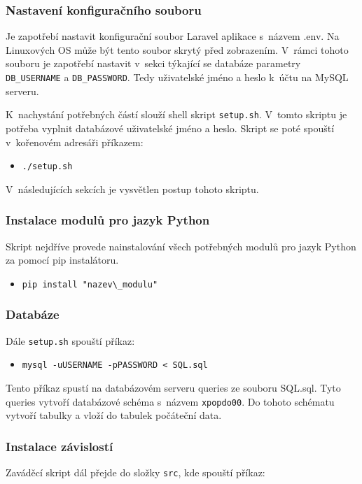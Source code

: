 \subsubsection{Nastavení konfiguračního souboru}
Je zapotřebí nastavit konfigurační soubor Laravel aplikace s~názvem .env. Na Linuxových OS může být tento soubor skrytý před zobrazením. V~rámci tohoto souboru je zapotřebí nastavit v~sekci týkající se databáze parametry \verb|DB_USERNAME| a \verb|DB_PASSWORD|. Tedy uživatelské jméno a heslo k~účtu na MySQL serveru.

K~nachystání potřebných částí slouží shell skript \verb|setup.sh|. V~tomto skriptu je potřeba vyplnit databázové uživatelské jméno a heslo. Skript se poté spouští v~kořenovém adresáři příkazem:
\begin{itemize}
	\item \verb|./setup.sh|
\end{itemize}

V~následujících sekcích je vysvětlen postup tohoto skriptu.

\subsubsection{Instalace modulů pro jazyk Python}
Skript nejdříve provede nainstalování všech potřebných modulů pro jazyk Python za pomocí pip instalátoru.

\begin{itemize}
	\item \verb|pip install "nazev\_modulu"|
\end{itemize}

\subsubsection{Databáze}
Dále \verb|setup.sh| spouští příkaz:

\begin{itemize}
	\item \verb|mysql -uUSERNAME -pPASSWORD < SQL.sql|
\end{itemize}

Tento příkaz spustí na databázovém serveru queries ze souboru SQL.sql. Tyto queries vytvoří databázové schéma s~názvem \verb|xpopdo00|. Do tohoto schématu vytvoří tabulky a vloží do tabulek počáteční data.

\subsubsection{Instalace závislostí}
Zaváděcí skript dál přejde do složky \verb|src|, kde spouští příkaz: 

